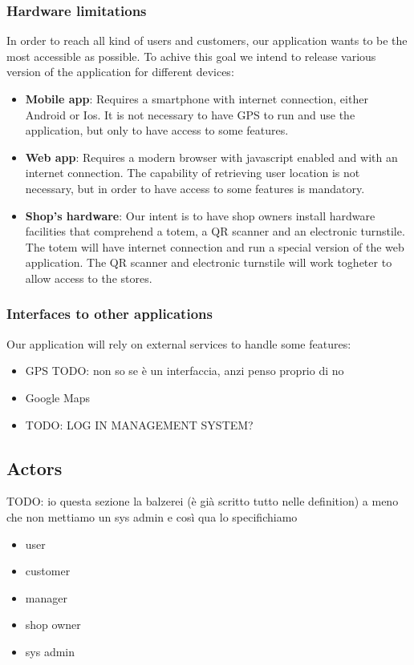 \subsubsection{Hardware limitations}
\label{subsubsect:hardwarelimitations}

In order to reach all kind of users and customers, our application wants to be the most accessible as possible. To achive this goal we intend to release various version of the application for different devices:

\begin{itemize}
    \item \textbf{Mobile app}: Requires a smartphone with internet connection, either Android or Ios. It is not necessary to have GPS to run and use the application, but only to have access to some features.
    \item \textbf{Web app}: Requires a modern browser with javascript enabled and with an internet connection. The capability of retrieving user location is not necessary, but in order to have access to some features is mandatory.
    \item \textbf{Shop's hardware}: Our intent is to have shop owners install hardware facilities that comprehend a totem, a QR scanner and an electronic turnstile. The totem will have internet connection and run a special version of the web application. The QR scanner and electronic turnstile will work togheter to allow access to the stores. 
\end{itemize}

\subsubsection{Interfaces to other applications}
\label{subsubsect:interfacestootherappications}

Our application will rely on external services to handle some features:

\begin{itemize}
    \item GPS TODO: non so se è un interfaccia, anzi penso proprio di no
    \item Google Maps
    \item TODO: LOG IN MANAGEMENT SYSTEM?
\end{itemize}

\subsection{Actors}
\label{subsect:actors}
TODO: io questa sezione la balzerei (è già scritto tutto nelle definition) a meno che non mettiamo un sys admin e così qua lo specifichiamo
\begin{itemize}
    \item user
    \item customer
    \item manager
    \item shop owner
    \item sys admin
\end{itemize}

